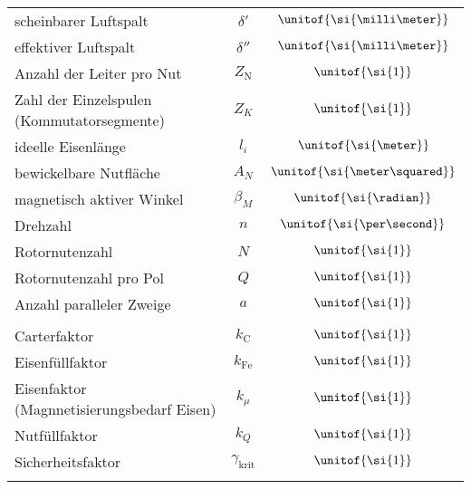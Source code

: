 {{\begin{tabular*}{\columnwidth}{p{4.2cm}cc}
scheinbarer Luftspalt & $\delta'$ & $\unitof{\si{\milli\meter}}$\\
effektiver Luftspalt & $\delta''$ & $\unitof{\si{\milli\meter}}$\\
Anzahl der Leiter pro Nut & $Z_\text{N}$ & $\unitof{\si{1}}$\\
Zahl der Einzelspulen (Kommutatorsegmente) & $Z_K$ & $\unitof{\si{1}}$\\
ideelle Eisenlänge & $l_i$ & $\unitof{\si{\meter}}$\\
bewickelbare Nutfläche & $A_N$ & $\unitof{\si{\meter\squared}}$\\
magnetisch aktiver Winkel & $\beta_M$ & $\unitof{\si{\radian}}$\\
Drehzahl & $n$ & $\unitof{\si{\per\second}}$\\
Rotornutenzahl & $N$ & $\unitof{\si{1}}$\\
Rotornutenzahl pro Pol & $Q$ & $\unitof{\si{1}}$\\
Anzahl paralleler Zweige & $a$ & $\unitof{\si{1}}$\\
\cmrule
\multicolumn{3}{c}{\textbf{Näherungsfaktoren}}\\
\cmrule
Carterfaktor & $k_\text{C}$ & $\unitof{\si{1}}$\\
Eisenfüllfaktor & $k_\text{Fe}$ & $\unitof{\si{1}}$\\
Eisenfaktor (Magnnetisierungsbedarf Eisen) & $k_\mu$ & $\unitof{\si{1}}$\\
Nutfüllfaktor & $k_Q$ & $\unitof{\si{1}}$\\
Sicherheitsfaktor & $\gamma_\text{krit}$ & $\unitof{\si{1}}$\\
\cbrule
\end{tabular*}
}
}
